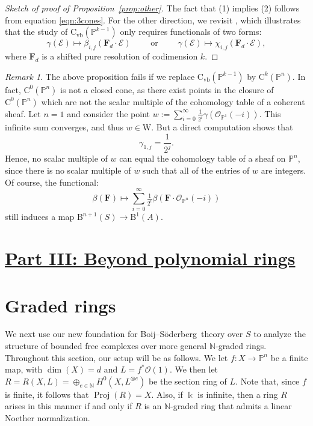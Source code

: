 \documentclass[12pt]{amsart}
\theoremstyle{definition}
\theoremstyle{remark}
\newtheorem{remark}[lemma]{Remark}
\newcommand{\Proj}{\operatorname{Proj}}
\newcommand{\kk}{\Bbbk}
\newcommand{\PP}{\mathbb{P}}
\newcommand{\WW}{\mathrm{W}}
\newcommand{\NN}{\mathbb{N}}
\newcommand{\cO}{\mathcal{O}}
\newcommand{\cE}{\mathcal{E}}
\newcommand{\FF}{\mathbf{F}}
\newcommand{\CQ}{\mathrm{C}}
\newcommand{\CvbQ}{\mathrm{C}_{\text{vb}}}
\newcommand{\BBQ}{\mathrm{B}}
\def\BS{Boij--S\"oderberg~}
\begin{document}
\begin{proof}[Sketch of proof of Proposition~\ref{prop:other}]
The fact that (1) implies (2) follows from equation \eqref{eqn:3cones}.  For the other direction, we revisit \cite[Proof of Theorem~0.5]{eis-schrey1}, which illustrates that the study of $\CvbQ(\PP^{k-1})$ only requires functionals of two forms:
\[
\gamma(\cE)\mapsto\beta_{i,j}(\FF_d\cdot \cE) \qquad \text{ or } \qquad \gamma(\cE)\mapsto\chi_{i,j}(\FF_d\cdot \cE),
\]
where $\FF_d$ is a shifted pure resolution of codimension $k$.
\end{proof}


\begin{remark}\label{rmk:issues}
The above proposition fails if we replace $\CvbQ(\PP^{k-1})$ by $\CQ^k(\PP^n)$.  
In fact, $\CQ^0(\PP^n)$ is not a closed cone, as there exist points in the closure of $\CQ^0(\PP^n)$ which are not the scalar multiple of the cohomology table of a coherent sheaf.   Let $n=1$ and consider the point $w:=\sum_{i=0}^\infty \frac{1}{2^i} \gamma(\cO_{\PP^1}(-i))$.  
This infinite sum converges, and thus $w\in \WW$.  But a direct computation shows that
\[
\gamma_{1,j}=\frac{1}{2^{j}}.
\]
Hence, no scalar multiple of $w$ can equal the cohomology table of a sheaf on $\PP^n$, since there is no scalar multiple of $w$ such that all of the entries of $w$ are integers.  Of course, the functional:
\[
\beta(\FF)\mapsto \sum_{i=0}^\infty \tfrac{1}{2^i} \beta(\FF\cdot \cO_{\PP^n}(-i))
\]
still induces a map $\BBQ^{n+1}(S)\to \BBQ^1(A)$.
%
\end{remark}


\section*{\underline{{Part III: Beyond polynomial rings}}}
\section{Graded rings}\label{sec:functor}
We next use our new foundation for \BS theory over $S$ to analyze the structure of bounded free complexes over more general $\NN$-graded rings.  Throughout this section, our setup will be as follows.  We let $f\colon X\to \PP^n$ be a finite map, with $\dim(X)=d$ and $L=f^*\cO(1)$.  We then let $R=R(X,L)=\oplus_{e\in \mathbb N} H^0(X,L^{\otimes e})$ be the section ring of $L$.  Note that, since $f$ is finite, it follows that $\Proj(R)=X$.  Also, if $\kk$ is infinite, then a ring $R$ arises in this manner if and only if $R$ is an $\mathbb N$-graded ring that admits a linear Noether normalization.
\end{document}
